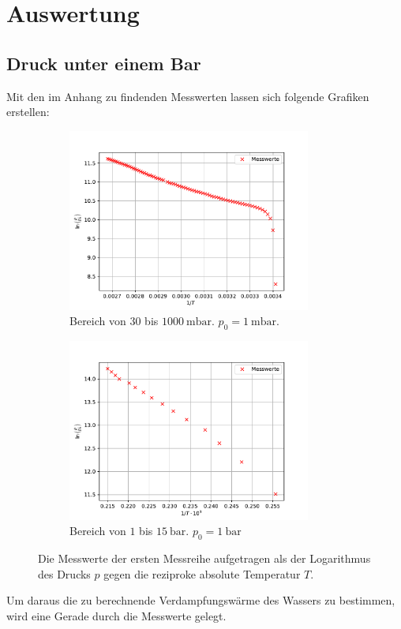 \section{Auswertung}
\label{sec:Auswertung}

\subsection{Druck unter einem Bar}
Mit den im Anhang zu findenden Messwerten lassen sich folgende Grafiken erstellen:
\begin{figure}[H]
  \begin{subfigure}{0.48\textwidth}
      \includegraphics[height=6cm]{plota.pdf}  
    \caption{Bereich von $30$ bis $\SI{1000}{\milli\bar}$. $p_0=\SI{1}{\milli\bar}$.}
    \label{fig:MesswerteKlein}
  \end{subfigure}
  \hfill
  \begin{subfigure}{0.48\textwidth}
    \includegraphics[height=6cm]{plotb.pdf}
    \caption{Bereich von $1$ bis $\SI{15}{\bar}$. $p_0=\SI{1}{\bar}$}
    \label{fig:MesswerteGross}
  \end{subfigure}
  \caption{Die Messwerte der ersten Messreihe aufgetragen als der Logarithmus des Drucks $p$
  gegen die reziproke absolute Temperatur $T$.}
  \label{fig:Teila}
\end{figure}
Um daraus die zu berechnende Verdampfungswärme des Wassers zu bestimmen, wird eine Gerade durch die Messwerte gelegt.
